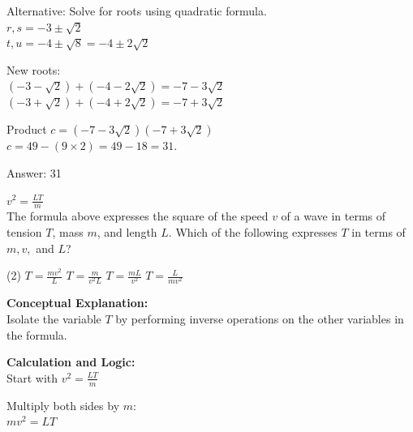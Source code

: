 \documentclass[11pt,paper=a4,answers]{exam}
\begin{document}
\begin{questions}
\begin{solution}
\vspace{10pt}

Alternative: Solve for roots using quadratic formula. \\
$r, s = -3 \pm \sqrt{2}$ \\
$t, u = -4 \pm \sqrt{8} = -4 \pm 2\sqrt{2}$

\vspace{10pt}

New roots: \\
$(-3 - \sqrt{2}) + (-4 - 2\sqrt{2}) = -7 - 3\sqrt{2}$ \\
$(-3 + \sqrt{2}) + (-4 + 2\sqrt{2}) = -7 + 3\sqrt{2}$

\vspace{10pt}

Product $c = (-7 - 3\sqrt{2})(-7 + 3\sqrt{2})$ \\
$c = 49 - (9 \times 2) = 49 - 18 = 31$.

\vspace{25pt}

Answer: \colorbox{yellow!100}{31}
\end{solution}

\vspace{40pt}

\question
$v^2 = \frac{LT}{m}$ \\
The formula above expresses the square of the speed $v$ of a wave in terms of tension $T$, mass $m$, and length $L$. Which of the following expresses $T$ in terms of $m, v,$ and $L$?
\begin{tasks}(2)
    \task $T = \frac{mv^2}{L}$
    \task $T = \frac{m}{v^2L}$
    \task $T = \frac{mL}{v^2}$
    \task $T = \frac{L}{mv^2}$
\end{tasks}

\begin{solution}
\textbf{Conceptual Explanation:} \\
Isolate the variable $T$ by performing inverse operations on the other variables in the formula.

\vspace{20pt}

\textbf{Calculation and Logic:} \\
Start with $v^2 = \frac{LT}{m}$

\vspace{10pt}

Multiply both sides by $m$: \\
$mv^2 = LT$


\end{solution}
\end{questions}
\end{document}
